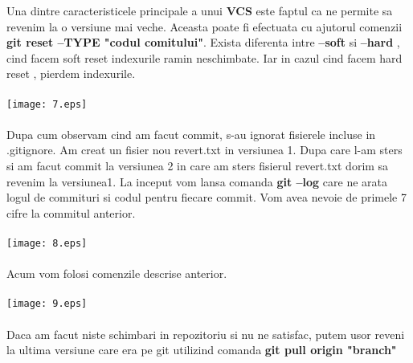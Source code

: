 \tab Una dintre caracteristicele principale a unui \textbf{VCS} este faptul ca
ne permite sa revenim la o versiune mai veche. Aceasta poate fi efectuata cu ajutorul
comenzii \textbf{git reset --TYPE "codul comitului"}. Exista diferenta intre 
\textbf{--soft} si \textbf{--hard} , cind facem soft reset indexurile ramin neschimbate.
Iar in cazul cind facem hard reset , pierdem indexurile.
\\
\\
\texttt{[image: 7.eps]}
\\
\\
Dupa cum observam cind am facut commit, s-au ignorat fisierele incluse in .gitignore.
\clearpage
\tab Am creat un fisier nou revert.txt in versiunea 1. Dupa care l-am sters si am facut
commit la versiunea 2 in care am sters fisierul revert.txt dorim sa revenim la versiunea1. La inceput vom lansa comanda \textbf{git --log} care ne arata logul de commituri si
codul pentru fiecare commit. Vom avea nevoie de primele 7 cifre la commitul anterior.\\
\\
\texttt{[image: 8.eps]}\\
\\
Acum vom folosi comenzile descrise anterior.\\
\\
\texttt{[image: 9.eps]}\\
\\
Daca am facut niste schimbari in repozitoriu si nu ne satisfac, putem usor reveni
la ultima versiune care era pe git utilizind comanda \textbf{git pull origin "branch"}
